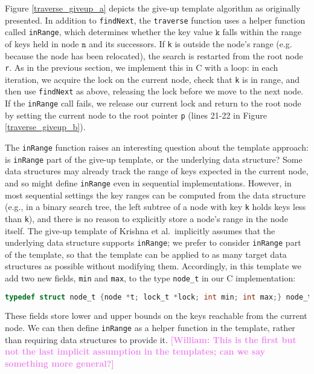 \documentclass[a4paper,UKenglish,cleveref, autoref, thm-restate]{lipics-v2021}
\newcommand{\wm}[1]{\textbf{\textcolor{violet}{[William: #1]}}}
\begin{document}
Figure \ref{traverse_giveup_a} depicts the give-up template algorithm as originally presented. In addition to \lstinline{findNext}, the \lstinline{traverse} function uses a helper function called \lstinline{inRange}, which determines whether the key value $\texttt{k}$ falls within the range of keys held in node $\texttt{n}$ and its successors. If \lstinline{k} is outside the node's range (e.g. because the node has been relocated), the search is restarted from the root node \lstinline{r}. As in the previous section, we implement this in C with a loop: in each iteration, we acquire the lock on the current node, check that \lstinline{k} is in range, and then use \lstinline{findNext} as above, releasing the lock before we move to the next node. If the \lstinline{inRange} call fails, we release our current lock and return to the root node by setting the current node to the root pointer \lstinline{p} (lines 21-22 in Figure \ref{traverse_giveup_b}).

The \lstinline{inRange} function raises an interesting question about the template approach: is \lstinline{inRange} part of the give-up template, or the underlying data structure? Some data structures may already track the range of keys expected in the current node, and so might define \lstinline{inRange} even in sequential implementations. However, in most sequential settings the key ranges can be computed from the data structure (e.g., in a binary search tree, the left subtree of a node with key \lstinline{k} holds keys less than \lstinline{k}), and there is no reason to explicitly store a node's range in the node itself. The give-up template of Krishna et al.~implicitly assumes that the underlying data structure supports \lstinline{inRange}; we prefer to consider \lstinline{inRange} part of the template, so that the template can be applied to as many target data structures as possible without modifying them. Accordingly, in this template we add two new fields, \lstinline{min} and \lstinline{max}, to the type \lstinline{node_t} in our C implementation:
\begin{lstlisting}[language = C, backgroundcolor=\color{white}, basicstyle=\ttfamily\footnotesize]
	typedef struct node_t {node *t; lock_t *lock; int min; int max;} node_t;
\end{lstlisting}
These fields store lower and upper bounds on the keys reachable from the current node. %
We can then define \texttt{inRange} as a helper function in the template, rather than requiring data structures to provide it. \wm{This is the first but not the last implicit assumption in the templates; can we say something more general?}
\end{document}
